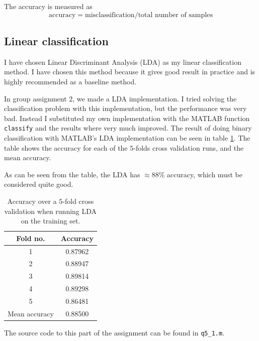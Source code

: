 \documentclass[10pt]{article}
\begin{document}
The accuracy is measured as 
\begin{equation}
  \text{accuracy} = \text{misclassification}/\text{total number of samples}
\end{equation}


\subsection*{Linear classification} %
\label{sub:linear_classification}
I have chosen Linear Discriminant Analysis (LDA) as my linear classification method. I have chosen this method because it gives good result in practice and is highly recommended as a baseline method\cite{LDAslides}. 

In group assignment 2, we made a LDA implementation\cite{assignment2}. I tried solving the classification problem with this implementation, but the performance was very bad. Instead I substituted my own implementation with the MATLAB function \texttt{classify} and the results where very much improved. The result of doing binary classification with MATLAB's LDA implementation can be seen in table \ref{table10}. The table shows the accuracy for each of the $5$-folds cross validation runs, and the mean accuracy. 

As can be seen from the table, the LDA has $\approx 88\%$ accuracy, which must be considered quite good.

\begin{table}
  \begin{center}  
    \begin{tabular}{ | c | c |}
      \hline
      Fold no. & Accuracy\\
      \hline
      1    &     0.87962\\
      2    &     0.88947\\
      3    &     0.89814\\
      4    &     0.89298\\
      5    &     0.86481\\
      \hline
      Mean accuracy &  0.88500\\
      \hline
    \end{tabular}
    \caption{Accuracy over a $5$-fold cross validation when running LDA on the training set.}
    \label{table10}
  \end{center}    
\end{table}   

The source code to this part of the assignment can be found in \texttt{q5\_1.m}.
\end{document}

